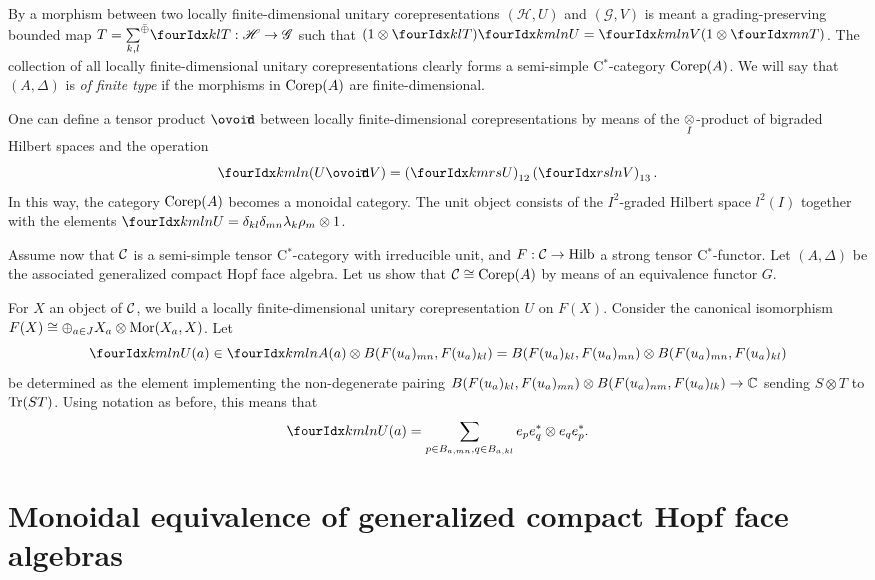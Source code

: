 By a morphism between two locally finite-dimensional unitary corepresentations $(\mathscr{H},U)$ and $(\mathscr{G},V)$ is meant a grading-preserving bounded map $T = \osumc{k,l} \Gru{T}{k}{l}:\mathscr{H}\rightarrow \mathscr{G}$ such that $(1\otimes \Gru{T}{k}{l})\Gr{U}{k}{l}{m}{n} = \Gr{V}{k}{l}{m}{n}(1\otimes \Gru{T}{m}{n})$. The collection of all locally finite-dimensional unitary corepresentations clearly forms a semi-simple C$^*$-category $\mathrm{Corep}(A)$. We will say that $(A,\Delta)$ is \emph{of finite type} if the morphisms in $\mathrm{Corep}(A)$ are finite-dimensional.

One can define a tensor product $\Circt$ between locally finite-dimensional corepresentations by means of the $\underset{I}{\otimes}$-product of bigraded Hilbert spaces and the operation
\[\Gr{(U\Circt V)}{k}{l}{m}{n} = \left(\Gr{U}{k}{r}{m}{s}\right)_{12}\left(\Gr{V}{r}{l}{s}{n}\right)_{13}.\] In this way, the category $\mathrm{Corep}(A)$ becomes a monoidal category. The unit object consists of the $I^2$-graded Hilbert space $l^2(I)$ together with the elements $\Gr{U}{k}{l}{m}{n}= \delta_{kl}\delta_{mn}\lambda_k\rho_m\otimes 1$.

Assume now that $\mathcal{C}$ is a semi-simple tensor C$^*$-category with irreducible unit, and $F:\mathcal{C}\rightarrow \mathrm{Hilb}$ a strong tensor C$^*$-functor. Let $(A,\Delta)$ be the associated generalized compact Hopf face algebra. Let us show that $\mathcal{C}\cong \mathrm{Corep}(A)$ by means of an equivalence functor $G$.

For $X$ an object of $\mathcal{C}$, we build a locally finite-dimensional unitary corepresentation $U$ on $F(X)$. Consider the canonical isomorphism $F(X) \cong \oplus_{a\in J} X_a \otimes \mathrm{Mor}(X_a,X)$. Let \[\Gr{U}{k}{l}{m}{n}(a) \in  \Gr{A}{k}{l}{m}{n}(a)\otimes B(F(u_a)_{mn},F(u_a)_{kl})= B(F(u_a)_{kl},F(u_a)_{mn})\otimes B(F(u_a)_{mn},F(u_a)_{kl})\] be determined as the element implementing the non-degenerate pairing $B(F(u_a)_{kl},F(u_a)_{mn})\otimes B(F(u_a)_{nm},F(u_a)_{lk})\rightarrow \mathbb{C}$ sending $S\otimes T$ to $\mathrm{Tr}(ST)$. Using notation as before, this means that \[\Gr{U}{k}{l}{m}{n}(a) = \sum_{p\in B_{a,mn},q\in B_{a,kl}} e_pe_q^*\otimes e_qe_p^*.\]



\section*{Monoidal equivalence of generalized compact Hopf face algebras}

